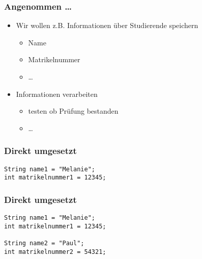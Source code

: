\documentclass{../../presentation}
\begin{document}
\begin{frame}
	\frametitle{Angenommen \dots}
	\begin{itemize}
		\item\pause Wir wollen z.B. Informationen über Studierende speichern
		      \begin{itemize}
			      \item<2->[\textbullet] Name
			      \item<3->[\textbullet] Matrikelnummer
			      \item<4->[\textbullet] \dots
		      \end{itemize}
		\item<5-> Informationen verarbeiten
		      \begin{itemize}
			      \item<6->[\textbullet] testen ob Prüfung bestanden
			      \item<7->[\textbullet] \dots
		      \end{itemize}
	\end{itemize}
\end{frame}



\begin{frame}[fragile,t]
	\frametitle{Direkt umgesetzt}
	\vspace{2.0em}
	\begin{minipage}[t][0.6\textheight][t]{\textwidth}
		\begin{verbatim}
String name1 = "Melanie";
int matrikelnummer1 = 12345;
\end{verbatim}
	\end{minipage}
\end{frame}



\begin{frame}[fragile,t]
	\frametitle{Direkt umgesetzt}
	\vspace{2.0em}
	\begin{minipage}[t][0.6\textheight][t]{\textwidth}
		\begin{verbatim}
String name1 = "Melanie";
int matrikelnummer1 = 12345;

String name2 = "Paul";
int matrikelnummer2 = 54321;
\end{verbatim}
	\end{minipage}
\end{frame}
\end{document}
